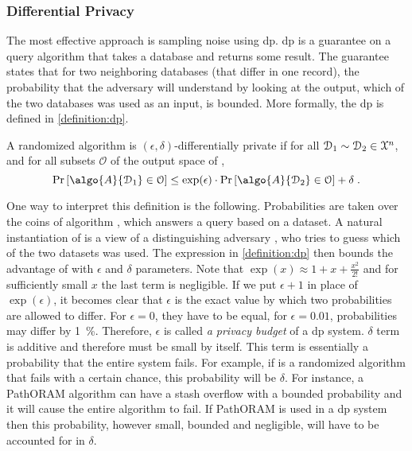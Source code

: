			\subsubsection{Differential Privacy}

				The most effective approach is sampling noise using \acrfull{dp}.
				\acrshort{dp} is a guarantee on a query algorithm that takes a database and returns some result.
				The guarantee states that for two neighboring databases (that differ in one record), the probability that the adversary will understand by looking at the output, which of the two databases was used as an input, is bounded.
				More formally, the \acrshort{dp} is defined in \cref{definition:dp}.

				\begin{definition}\label{definition:dp}
					A randomized algorithm  is $(\epsilon, \delta)$-differentially private if for all $\mathcal{D}_1 \sim \mathcal{D}_2 \in \mathcal{X}^{n}$, and for all subsets $\mathcal{O}$ of the output space of ,
					\[
						\probability{ \algo{A}{ \database_1 } \in \mathcal{O} } \leq \exp(\epsilon) \cdot \probability{ \algo{A}{ \database_2 } \in \mathcal{O} } + \delta \; .
					\]
				\end{definition}

				One way to interpret this definition is the following.
				Probabilities are taken over the coins of algorithm , which answers a query based on a dataset.
				A natural instantiation of  is a view of a distinguishing adversary \adversary{}, who tries to guess which of the two datasets was used.
				The expression in \cref{definition:dp} then bounds the advantage of \adversary{} with $\epsilon$ and $\delta$ parameters.
				Note that $\exp( x ) \approx 1 + x + \frac{x^2}{2!}$ and for sufficiently small $x$ the last term is negligible.
				If we put $\epsilon + 1$ in place of $\exp( \epsilon )$, it becomes clear that $\epsilon$ is the exact value by which two probabilities are allowed to differ.
				For $\epsilon = 0$, they have to be equal, for $\epsilon = 0.01$, probabilities may differ by \SI{1}{\percent}.
				Therefore, $\epsilon$ is called \emph{a privacy budget} of a \acrshort{dp} system.
				$\delta$ term is additive and therefore must be small by itself.
				This term is essentially a probability that the entire system fails.
				For example, if  is a randomized algorithm that fails with a certain chance, this probability will be $\delta$.
				For instance, a PathORAM \cite{path-oram} algorithm can have a stash overflow with a bounded probability \cite[Theorem 1]{path-oram} and it will cause the entire algorithm to fail.
				If PathORAM is used in a \acrshort{dp} system then this probability, however small, bounded and negligible, will have to be accounted for in $\delta$.

